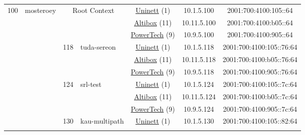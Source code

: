 \begin{small}
\begin{center}
\begin{longtable}{|c|c|c|c|c|c|c|c|}
 \multirow{42}{*}{\tiny{100}} & \multicolumn{1}{|l|}{\multirow{42}{*}{\tiny{mosteroey}}} & \multicolumn{2}{|c|}{\multirow{3}{*}{\tiny{Root Context}}} & \multicolumn{2}{|c|}{\tiny{\href{https://www.uninett.no}{Uninett} (1)}} & \tiny{10.1.5.100} & \tiny{2001:700:4100:105::64} \\* \cline{5-5}\cline{6-6}\cline{7-7}\cline{8-8}
  &  & \multicolumn{2}{|c|}{} & \multicolumn{2}{|c|}{\tiny{\href{https://www.altibox.no}{Altibox} (11)}} & \tiny{10.11.5.100} & \tiny{2001:700:4100:b05::64} \\* \cline{5-5}\cline{6-6}\cline{7-7}\cline{8-8}
  &  & \multicolumn{2}{|c|}{} & \multicolumn{2}{|c|}{\tiny{\href{http://www.powertech.no}{PowerTech} (9)}} & \tiny{10.9.5.100} & \tiny{2001:700:4100:905::64} \\* \cline{3-3}\cline{4-4}\cline{5-5}\cline{6-6}\cline{7-7}\cline{8-8}
  &  & \multirow{3}{*}{\tiny{118}} & \multicolumn{1}{|l|}{\multirow{3}{*}{\tiny{tuda-sereon}}} & \multicolumn{2}{|c|}{\tiny{\href{https://www.uninett.no}{Uninett} (1)}} & \tiny{10.1.5.118} & \tiny{2001:700:4100:105::76:64} \\* \cline{5-5}\cline{6-6}\cline{7-7}\cline{8-8}
  &  &  &  & \multicolumn{2}{|c|}{\tiny{\href{https://www.altibox.no}{Altibox} (11)}} & \tiny{10.11.5.118} & \tiny{2001:700:4100:b05::76:64} \\* \cline{5-5}\cline{6-6}\cline{7-7}\cline{8-8}
  &  &  &  & \multicolumn{2}{|c|}{\tiny{\href{http://www.powertech.no}{PowerTech} (9)}} & \tiny{10.9.5.118} & \tiny{2001:700:4100:905::76:64} \\* \cline{3-3}\cline{4-4}\cline{5-5}\cline{6-6}\cline{7-7}\cline{8-8}
  &  & \multirow{3}{*}{\tiny{124}} & \multicolumn{1}{|l|}{\multirow{3}{*}{\tiny{srl-test}}} & \multicolumn{2}{|c|}{\tiny{\href{https://www.uninett.no}{Uninett} (1)}} & \tiny{10.1.5.124} & \tiny{2001:700:4100:105::7c:64} \\* \cline{5-5}\cline{6-6}\cline{7-7}\cline{8-8}
  &  &  &  & \multicolumn{2}{|c|}{\tiny{\href{https://www.altibox.no}{Altibox} (11)}} & \tiny{10.11.5.124} & \tiny{2001:700:4100:b05::7c:64} \\* \cline{5-5}\cline{6-6}\cline{7-7}\cline{8-8}
  &  &  &  & \multicolumn{2}{|c|}{\tiny{\href{http://www.powertech.no}{PowerTech} (9)}} & \tiny{10.9.5.124} & \tiny{2001:700:4100:905::7c:64} \\* \cline{3-3}\cline{4-4}\cline{5-5}\cline{6-6}\cline{7-7}\cline{8-8}
  &  & \multirow{3}{*}{\tiny{130}} & \multicolumn{1}{|l|}{\multirow{3}{*}{\tiny{kau-multipath}}} & \multicolumn{2}{|c|}{\tiny{\href{https://www.uninett.no}{Uninett} (1)}} & \tiny{10.1.5.130} & \tiny{2001:700:4100:105::82:64} \\* \cline{5-5}\cline{6-6}\cline{7-7}\cline{8-8}

\end{longtable}
\end{center}
\end{small}
